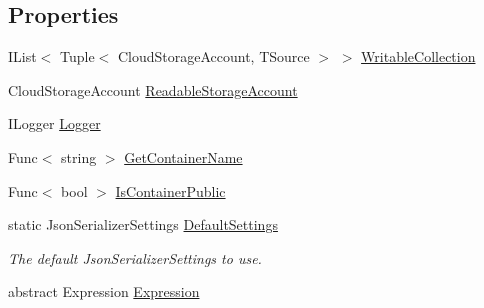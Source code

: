 \subsection*{Properties}
\begin{DoxyCompactItemize}
\item 
I\+List$<$ Tuple$<$ Cloud\+Storage\+Account, T\+Source $>$ $>$ \hyperlink{classCqrs_1_1Azure_1_1BlobStorage_1_1StorageStore_aece11e874587ca60913d275079dfc13c_aece11e874587ca60913d275079dfc13c}{Writable\+Collection}
\item 
Cloud\+Storage\+Account \hyperlink{classCqrs_1_1Azure_1_1BlobStorage_1_1StorageStore_af0e0bcba6758fda015f51b07eb464b14_af0e0bcba6758fda015f51b07eb464b14}{Readable\+Storage\+Account}
\item 
I\+Logger \hyperlink{classCqrs_1_1Azure_1_1BlobStorage_1_1StorageStore_acb1c7917bb897f51685d367b035ee119_acb1c7917bb897f51685d367b035ee119}{Logger}
\item 
Func$<$ string $>$ \hyperlink{classCqrs_1_1Azure_1_1BlobStorage_1_1StorageStore_acc1c1e865c9a59772a29cfe44d39e48a_acc1c1e865c9a59772a29cfe44d39e48a}{Get\+Container\+Name}
\item 
Func$<$ bool $>$ \hyperlink{classCqrs_1_1Azure_1_1BlobStorage_1_1StorageStore_a80dc0d2697bbd1e652d5194df8744ae8_a80dc0d2697bbd1e652d5194df8744ae8}{Is\+Container\+Public}
\item 
static Json\+Serializer\+Settings \hyperlink{classCqrs_1_1Azure_1_1BlobStorage_1_1StorageStore_ac5c27123fd0bf4d926a4865e2d6b0bdd_ac5c27123fd0bf4d926a4865e2d6b0bdd}{Default\+Settings}
\begin{DoxyCompactList}\small\item\em The default Json\+Serializer\+Settings to use. \end{DoxyCompactList}\item 
abstract Expression \hyperlink{classCqrs_1_1Azure_1_1BlobStorage_1_1StorageStore_a21c204b514718b8af550ce2a627c4b70_a21c204b514718b8af550ce2a627c4b70}{Expression}

\end{DoxyCompactItemize}
